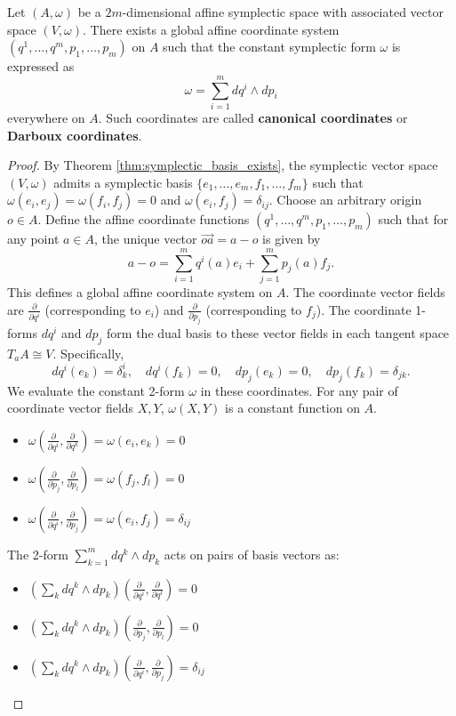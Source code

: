 \begin{theorem} \label{thm:affine_darboux}
Let $(A, \omega)$ be a $2m$-dimensional affine symplectic space with associated vector space $(V, \omega)$. There exists a global affine coordinate system $(q^1, \dots, q^m, p_1, \dots, p_m)$ on $A$ such that the constant symplectic form $\omega$ is expressed as
\[
\omega = \sum_{i=1}^m dq^i \wedge dp_i
\]
everywhere on $A$. Such coordinates are called \textbf{canonical coordinates} or \textbf{Darboux coordinates}.
\end{theorem}

\begin{proof}
By Theorem \ref{thm:symplectic_basis_exists}, the symplectic vector space $(V, \omega)$ admits a symplectic basis $\{e_1, \dots, e_m, f_1, \dots, f_m\}$ such that $\omega(e_i, e_j) = \omega(f_i, f_j) = 0$ and $\omega(e_i, f_j) = \delta_{ij}$. Choose an arbitrary origin $o \in A$. Define the affine coordinate functions $(q^1, \dots, q^m, p_1, \dots, p_m)$ such that for any point $a \in A$, the unique vector $\vec{oa} = a - o$ is given by
\[
a - o = \sum_{i=1}^m q^i(a) e_i + \sum_{j=1}^m p_j(a) f_j.
\]
This defines a global affine coordinate system on $A$. The coordinate vector fields are $\frac{\partial}{\partial q^i}$ (corresponding to $e_i$) and $\frac{\partial}{\partial p_j}$ (corresponding to $f_j$). The coordinate 1-forms $dq^i$ and $dp_j$ form the dual basis to these vector fields in each tangent space $T_a A \cong V$. Specifically, 
\[
dq^i(e_k) = \delta^i_k, \quad dq^i(f_k) = 0, \quad dp_j(e_k) = 0, \quad dp_j(f_k) = \delta_{jk}.
\]
We evaluate the constant 2-form $\omega$ in these coordinates. For any pair of coordinate vector fields $X, Y$, $\omega(X, Y)$ is a constant function on $A$.

\begin{itemize}
    \item $\omega\left(\frac{\partial}{\partial q^i}, \frac{\partial}{\partial q^k}\right) = \omega(e_i, e_k) = 0$
    \item $\omega\left(\frac{\partial}{\partial p_j}, \frac{\partial}{\partial p_l}\right) = \omega(f_j, f_l) = 0$
    \item $\omega\left(\frac{\partial}{\partial q^i}, \frac{\partial}{\partial p_j}\right) = \omega(e_i, f_j) = \delta_{ij}$
\end{itemize}

The 2-form $\sum_{k=1}^m dq^k \wedge dp_k$ acts on pairs of basis vectors as:

\begin{itemize}
    \item $\left(\sum_k dq^k \wedge dp_k\right)\left(\frac{\partial}{\partial q^i}, \frac{\partial}{\partial q^l}\right) = 0$
    \item $\left(\sum_k dq^k \wedge dp_k\right)\left(\frac{\partial}{\partial p_j}, \frac{\partial}{\partial p_l}\right) = 0$
    \item $\left(\sum_k dq^k \wedge dp_k\right)\left(\frac{\partial}{\partial q^i}, \frac{\partial}{\partial p_j}\right) = \delta_{ij}$
\end{itemize}


\end{proof}
